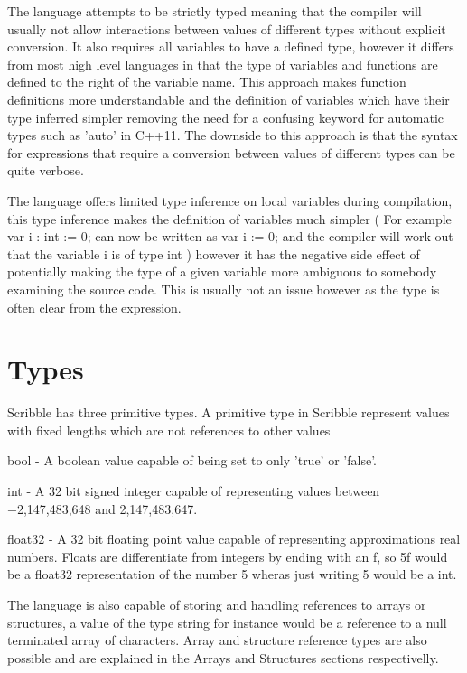 \documentclass[]{final_report}
\begin{document}
The language attempts to be strictly typed meaning that the compiler will usually not allow interactions between values of different types without explicit conversion. It also requires all variables to have a defined type, however it differs from most high level languages in that the type of variables and functions are defined to the right of the variable name. This approach makes function definitions more understandable and the definition of variables which have their type inferred simpler removing the need for a confusing keyword for automatic types such as 'auto' in C++11. The downside to this approach is that the syntax for expressions that require a conversion between values of different types can be quite verbose.

The language offers limited type inference on local variables during compilation, this type inference makes the definition of variables much simpler ( For example var i : int := 0; can now be written as var i := 0; and the compiler will work out that the variable i is of type int ) however it has the negative side effect of potentially making the type of a given variable more ambiguous to somebody examining the source code. This is usually not an issue however as the type is often clear from the expression.

\section{Types}

Scribble has three primitive types. A primitive type in Scribble represent values with fixed lengths which are not references to other values

bool - A boolean value capable of being set to only 'true' or 'false'.

int - A 32 bit signed integer capable of representing values between  −2,147,483,648 and 2,147,483,647.

float32 - A 32 bit floating point value capable of representing approximations real numbers. Floats are differentiate from integers by ending with an f, so 5f would be a float32 representation of the number 5 wheras just writing 5 would be a int.

The language is also capable of storing and handling references to arrays or structures, a value of the type string for instance would be a reference to a null terminated array of characters. Array and structure reference types are also possible and are explained in the Arrays and Structures sections respectivelly.
\end{document}
